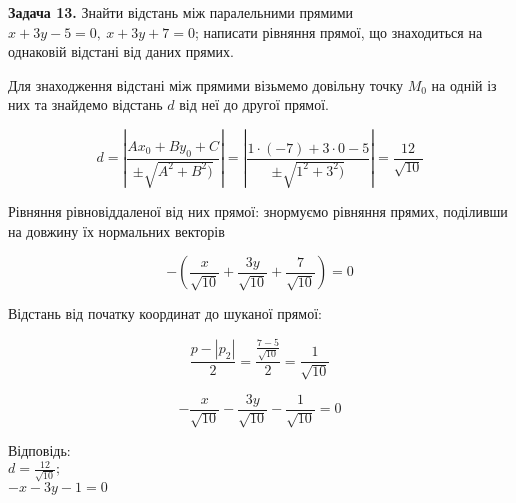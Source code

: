 \documentclass[14pt,draft]{extreport}
\begin{document}
\bigskip \textbf{Задача 13.} Знайти відстань між паралельними
прямими $x+3y-5=0,~x+3y+7=0$; написати рівняння прямої, що знаходиться на
однаковій відстані від даних прямих. \bigskip

\begin{wrapfigure}{l}{5.3cm}
	\centering
	
	\caption{}
\end{wrapfigure}

Для знаходження відстані між прямими візьмемо довільну
точку $M_0$ на одній із них та знайдемо відстань $d$
від неї до другої прямої.

\begin{equation}
	d=\left|\frac{A{x_0}+B{y_0}+C}{\pm\sqrt{A^2+B^2)}}\right|=
	\left|\frac{1\cdot(-7)+3\cdot0-5}{\pm\sqrt{1^2+3^2)}}\right|=
	\frac{12}{\sqrt{10}}
\end{equation}

Рівняння рівновіддаленої від них прямої: знормуємо
рівняння прямих, поділивши на довжину їх нормальних векторів

\begin{equation}
	-(\frac{x}{\sqrt{10}}+\frac{3y}{\sqrt{10}}+\frac{7}{\sqrt{10}})=0
\end{equation}

Відстань від початку координат до шуканої прямої:

$$\frac{p-|p_2|}{2}=\frac{\frac{7-5}{\sqrt{10}}}{2}=\frac{1}{\sqrt{10}}$$

$$-\frac{x}{\sqrt{10}}-\frac{3y}{\sqrt{10}}-\frac{1}{\sqrt{10}}=0$$


%
%
%

\null\hfill
\begin{boxedminipage}{0.23\textwidth}
Відповідь:\\
$d=\frac{12}{\sqrt{10}};$\\
$-x-3y-1=0$
\end{boxedminipage}
\end{document}
